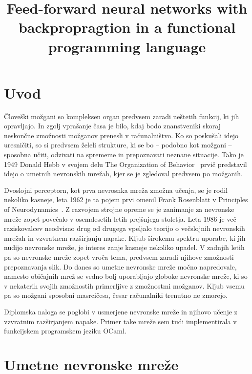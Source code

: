 \documentclass[mat1]{fmfdelo}
\title{Feed-forward neural networks with backpropragtion in a functional programming language}
\begin{document}
%
\section{Uvod}
%
Človeški možgani so kompleksen organ predvsem zaradi neštetih funkcij, ki jih opravljajo. In zgolj vprašanje časa je bilo, kdaj bodo znanstveniki skoraj neskončne zmožnosti možganov prenesli v računalništvo. Ko so poskušali idejo uresničiti, so si predvsem želeli strukture, ki se bo -- podobno kot možgani -- sposobna učiti, odzivati na sprememe in prepoznavati neznane situacije. Tako je 1949 Donald Hebb v svojem delu The Organization of Behavior~\cite{hebb} prvič predstavil idejo o umetnih nevronskih mrežah, kjer se je zgledoval predvsem po možganih. 

Dvoslojni perceptorn, kot prva nevrosnka mreža zmožna učenja, se je rodil nekoliko kasneje, leta 1962 je ta pojem prvi omenil Frank Rosenblatt v Principles of Neurodynamics~\cite{rosenblatt}. Z razvojem strojne opreme se je zanimanje za nevronske mreže zopet povečalo v osemdesetih letih prejšnjega stoletja. Leta 1986 je več raziskovalcev neodvisno drug od drugega vpeljalo teorijo o večslojnih nevronskih mrežah in vzvratnem razširjanju napake. Kljub širokemu spektru uporabe, ki jih nudijo nevronske mreže, je interes zanje kasneje nekoliko upadel. V zadnjih letih pa so nevronske mreže zopet vroča tema, predvsem zaradi njihove zmožnosti prepoznavanja slik. Do danes so umetne nevronske mreže močno napredovale, namesto običajnih mrež se vedno bolj uporabljajo globoke nevronske mreže, ki so v nekaterih svojih zmožnostih primerljive z zmožnostmi možganov. Kljub vsemu pa so možgani sposobni masrcičesa, česar računalniki trenutno ne zmorejo.

Diplomska naloga se poglobi v usmerjene nevronske mreže in njihovo učenje z vzvratnim razširjanjem napake. Primer take mreže sem tudi implementirala v funkcijskem programskem jeziku OCaml. 
%
\section{Umetne nevronske mreže}
%
%
\end{document}
